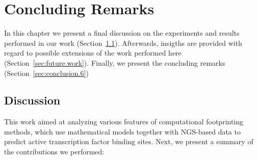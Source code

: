 \chapter{Concluding Remarks}
\label{cha:concluding.remarks}

\graphicspath{{chapter6/figs/}}

In this chapter we present a final discussion on the experiments and results performed in our work (Section~\ref{sec:discussion}). Afterwards, insigths are provided with regard to possible extensions of the work performed here (Section~\ref{sec:future.work}). Finally, we present the concluding remarks (Section~\ref{sec:conclusion.6})

\section{Discussion}
\label{sec:discussion}

This work aimed at analyzing various features of computational footprinting methods, which use mathematical models together with NGS-based data to predict active transcription factor binding sites. Next, we present a summary of the contributions we performed:

